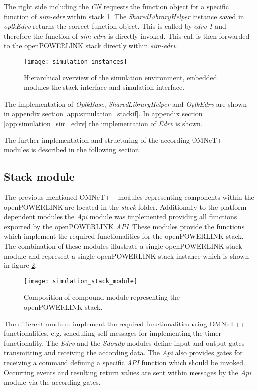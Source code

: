 The right side including the \emph{CN} requests the function object for a specific function of \emph{sim-edrv} within stack 1.
The \emph{SharedLibraryHelper} instance saved in \emph{oplkEdrv} returns the correct function object.
This is called by \emph{edrv 1} and therefore the function of \emph{sim-edrv} is directly invoked.
This call is then forwarded to the openPOWERLINK stack directly within \emph{sim-edrv}.

\begin{figure}
    \centering
    \texttt{[image: simulation\_instances]}
    \caption{Hierarchical overview of the simulation environment, embedded modules the stack interface and simulation interface.}
    \label{fig:simulation_instances}
\end{figure}

The implementation of \emph{OplkBase}, \emph{SharedLibraryHelper} and \emph{OplkEdrv} are shown in appendix section \ref{app:simulation_stackif}.
In appendix section \ref{app:simulation_sim_edrv} the implementation of \emph{Edrv} is shown.

The further implementation and structuring of the according OMNeT++ modules is described in the following section.

\subsection{Stack module}
\label{sec:porting_stack_stackmodule}

The previous mentioned OMNeT++ modules representing components within the openPOWERLINK are located in the \emph{stack} folder.
Additionally to the platform dependent modules the \emph{Api} module was implemented providing all functions exported by the openPOWERLINK \emph{API}.
These modules provide the functions which implement the required functionalities for the openPOWERLINK stack.
The combination of these modules illustrate a single openPOWERLINK stack module and represent a single openPOWERLINK stack instance which is shown in figure \ref{fig:simulation_stack_module}.

\begin{figure}
    \centering
    \texttt{[image: simulation\_stack\_module]}
    \caption{Composition of compound module representing the openPOWERLINK stack.}
    \label{fig:simulation_stack_module}
\end{figure}

The different modules implement the required functionalities using OMNeT++ functionalities, e.g. scheduling self messages for implementing the timer functionality.
The \emph{Edrv} and the \emph{Sdoudp} modules define input and output gates transmitting and receiving the according data.
The \emph{Api} also provides gates for receiving a command defining a specific \emph{API} function which should be invoked.
Occurring events and resulting return values are sent within messages by the \emph{Api} module via the according gates.

